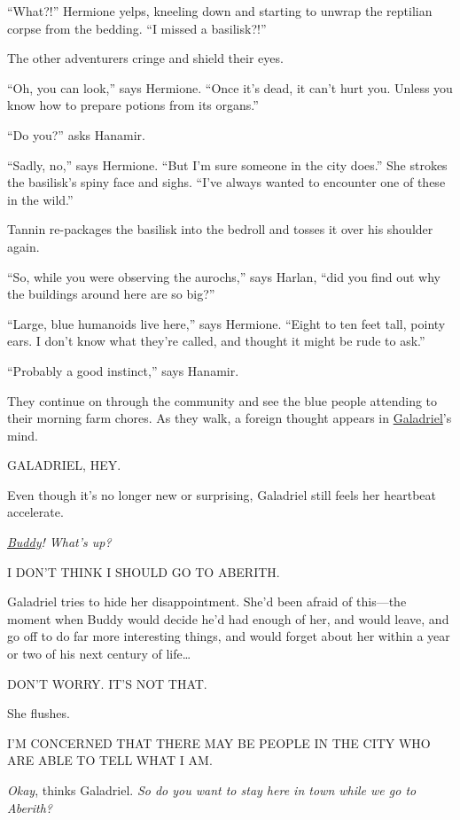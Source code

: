 \documentclass[smalldemyvopaper,11pt,twoside,onecolumn,openright,extrafontsizes]{memoir}
\begin{document}
``What?!'' Hermione yelps, kneeling down and starting to unwrap the
reptilian corpse from the bedding. ``I missed a basilisk?!''

The other adventurers cringe and shield their eyes.

``Oh, you can look,'' says Hermione. ``Once it's dead, it can't hurt
you. Unless you know how to prepare potions from its organs.''

``Do you?'' asks Hanamir.

``Sadly, no,'' says Hermione. ``But I'm sure someone in the city does.''
She strokes the basilisk's spiny face and sighs. ``I've always wanted to
encounter one of these in the wild.''

Tannin re-packages the basilisk into the bedroll and tosses it over his
shoulder again.

``So, while you were observing the aurochs,'' says Harlan, ``did you
find out why the buildings around here are so big?''

``Large, blue humanoids live here,'' says Hermione. ``Eight to ten feet
tall, pointy ears. I don't know what they're called, and thought it
might be rude to ask.''

``Probably a good instinct,'' says Hanamir.

They continue on through the community and see the blue people attending
to their morning farm chores. As they walk, a foreign thought appears in
\href{/characters/galadriel/}{Galadriel}'s mind.

GALADRIEL, HEY.

Even though it's no longer new or surprising, Galadriel still feels her
heartbeat accelerate.

\emph{\href{/characters/buddy/}{Buddy}! What's up?}

I DON'T THINK I SHOULD GO TO ABERITH.

Galadriel tries to hide her disappointment. She'd been afraid of
this---the moment when Buddy would decide he'd had enough of her, and
would leave, and go off to do far more interesting things, and would
forget about her within a year or two of his next century of
life\ldots{}

DON'T WORRY. IT'S NOT THAT.

She flushes.

I'M CONCERNED THAT THERE MAY BE PEOPLE IN THE CITY WHO ARE ABLE TO TELL
WHAT I AM.

\emph{Okay}, thinks Galadriel. \emph{So do you want to stay here in town
while we go to Aberith?}
\end{document}
